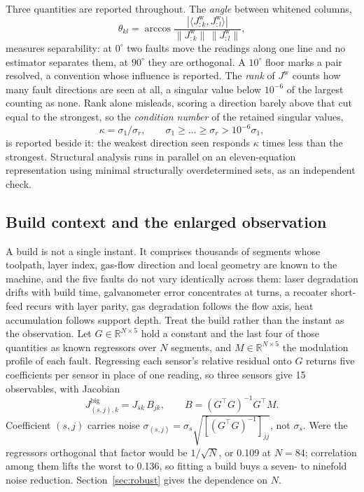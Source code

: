 \documentclass[final,5p,times,twocolumn]{elsarticle}
\begin{document}
Three quantities are reported throughout. The \emph{angle} between whitened columns,
\begin{equation}
\theta_{kl} = \arccos\frac{|\langle J^{\mathrm{w}}_{:k},
J^{\mathrm{w}}_{:l}\rangle|}{\|J^{\mathrm{w}}_{:k}\|\,\|J^{\mathrm{w}}_{:l}\|},
\label{eq:angle}
\end{equation}
measures separability: at $0^\circ$ two faults move the readings along one line and no estimator separates them, at $90^\circ$ they are orthogonal. A
$10^\circ$ floor marks a pair resolved, a convention whose influence is reported. The \emph{rank} of $J^{\mathrm{w}}$ counts how many fault directions are seen at all, a singular value below $10^{-6}$ of the largest counting as none. Rank alone misleads, scoring a direction barely above that cut equal to the strongest, so the \emph{condition number} of the retained singular values,
\begin{equation}
\kappa = \sigma_1/\sigma_r,
\qquad \sigma_1 \ge \dots \ge \sigma_r > 10^{-6}\sigma_1,
\label{eq:cond}
\end{equation}
is reported beside it: the weakest direction seen responds $\kappa$ times less than the strongest. Structural analysis runs in parallel on an eleven-equation representation using minimal structurally overdetermined sets, as an independent check.

\subsection{Build context and the enlarged observation}
\label{sec:context}

A build is not a single instant. It comprises thousands of segments whose
toolpath, layer index, gas-flow direction and local geometry are known to the
machine, and the five faults do not vary identically across them: laser
degradation drifts with build time, galvanometer error concentrates at turns, a
recoater short-feed recurs with layer parity, gas degradation follows the flow
axis, heat accumulation follows support depth. Treat the build rather than the
instant as the observation. Let $G\in\mathbb{R}^{N\times 5}$ hold a constant and
the last four of those quantities as known regressors over $N$ segments, and
$M\in\mathbb{R}^{N\times 5}$ the modulation profile of each fault. Regressing
each sensor's relative residual onto $G$ returns five coefficients per sensor in
place of one reading, so three sensors give 15 observables, with Jacobian
%
\begin{equation}
J^{\mathrm{big}}_{(s,j),k} = J_{sk}\,B_{jk},
\qquad B = (G^{\!\top}G)^{-1}G^{\!\top}M .
\label{eq:big}
\end{equation}
%
Coefficient $(s,j)$ carries noise $\sigma_{(s,j)} =
\sigma_s\sqrt{[(G^{\!\top}G)^{-1}]_{jj}}$, not $\sigma_s$. Were the regressors
orthogonal that factor would be $1/\sqrt{N}$, or 0.109 at $N=84$; correlation
among them lifts the worst to 0.136, so fitting a build buys a seven- to
ninefold noise reduction. Section~\ref{sec:robust} gives the dependence on $N$.
\end{document}
